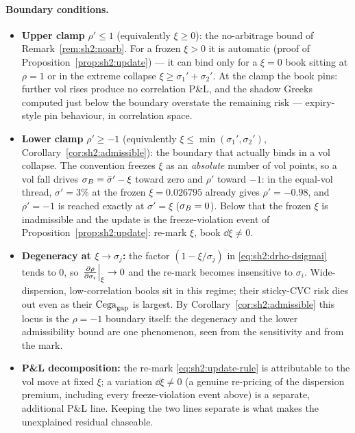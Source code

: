\paragraph{Boundary conditions.}
\begin{itemize}[leftmargin=1.5em]
\item \textbf{Upper clamp} $\rho' \le 1$ (equivalently $\xi \ge 0$): the
  no-arbitrage bound of Remark~\ref{rem:sh2:noarb}. For a frozen $\xi > 0$
  it is automatic (proof of Proposition~\ref{prop:sh2:update}) --- it can
  bind only for a $\xi = 0$ book sitting at $\rho = 1$ or in the extreme
  collapse $\xi \ge \sigma_1' + \sigma_2'$. At the clamp the book
  pins: further vol rises produce no correlation P\&L, and the shadow
  Greeks computed just below the boundary overstate the remaining risk ---
  expiry-style pin behaviour, in correlation space.
\item \textbf{Lower clamp} $\rho' \ge -1$ (equivalently
  $\xi \le \min(\sigma_1', \sigma_2')$, Corollary~\ref{cor:sh2:admissible}):
  the boundary that actually binds in a vol collapse. The convention
  freezes $\xi$ as an \emph{absolute} number of vol points, so a vol fall
  drives $\sigma_B = \bar\sigma' - \xi$ toward zero and $\rho'$ toward $-1$: in
  the equal-vol thread, $\sigma' = 3\%$ at the frozen $\xi = 0.026795$
  already gives $\rho' = -0.98$, and $\rho' = -1$ is reached exactly at
  $\sigma' = \xi$ ($\sigma_B = 0$). Below that the frozen $\xi$ is
  inadmissible and the update is the freeze-violation event of
  Proposition~\ref{prop:sh2:update}: re-mark $\xi$, book $\dd\xi \neq 0$.
\item \textbf{Degeneracy at $\xi \to \sigma_j$:} the factor
  $(1 - \xi/\sigma_j)$ in \eqref{eq:sh2:drho-dsigmai} tends to $0$, so
  $\left.\frac{\partial \rho}{\partial \sigma_i}\right|_{\xi} \to 0$ and the re-mark becomes
  insensitive to $\sigma_i$. Wide-dispersion, low-correlation books sit in
  this regime; their sticky-CVC risk dies out even as their $\mathrm{Cega}_{\mathrm{gap}}$ is
  largest. By Corollary~\ref{cor:sh2:admissible} this locus is the
  $\rho = -1$ boundary itself: the degeneracy and the lower admissibility
  bound are one phenomenon, seen from the sensitivity and from the mark.
\item \textbf{P\&L decomposition:} the re-mark
  \eqref{eq:sh2:update-rule} is attributable to the vol move at fixed
  $\xi$; a variation $\dd\xi \neq 0$ (a genuine re-pricing of the
  dispersion premium, including every freeze-violation event above) is a
  separate, additional P\&L line. Keeping the two
  lines separate is what makes the unexplained residual chaseable.
\end{itemize}

